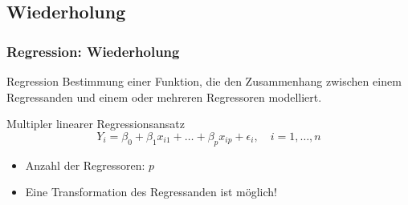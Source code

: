 \documentclass{beamer}
\begin{document}
\subsection{Wiederholung}
\begin{frame}
  \frametitle{Regression: Wiederholung}

  \begin{block}{Regression}
    Bestimmung einer Funktion, die den Zusammenhang zwischen einem Regressanden und einem oder mehreren Regressoren modelliert.
  \end{block}
  
  \pause

  \begin{block}{Multipler linearer Regressionsansatz}
    \begin{equation*}
      Y_i = \beta_0 + \beta_1 x_{i1} + \dots + \beta_p x_{ip} + \epsilon_i, \quad i = 1, \dots, n
    \end{equation*}
    \begin{itemize}
    \item Anzahl der Regressoren: $p$
    \end{itemize}
  \end{block}

  \begin{itemize}
  \item Eine Transformation des Regressanden ist möglich!
  \end{itemize}

\end{frame}
\end{document}
